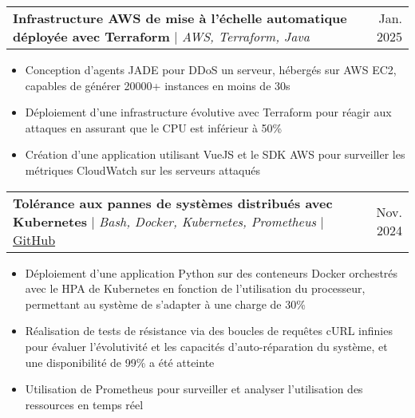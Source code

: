 \documentclass[letterpaper,10.5t]{article}
\makeatletter
\newcommand{\resumeItem}[1]{
  \item\small{
    {#1 \vspace{-2pt}}
  }
}
\newcommand{\resumeProjectHeading}[2]{
    \item
    \begin{tabular*}{0.97\textwidth}{l@{\extracolsep{\fill}}r}
      \small#1 & #2 \\
    \end{tabular*}\vspace{-7pt}
}
\newcommand{\resumeItemListStart}{\begin{itemize}}
\newcommand{\resumeItemListEnd}{\end{itemize}\vspace{-5pt}}
\makeatother
\begin{document}
        \resumeProjectHeading
        {\textbf{Infrastructure AWS de mise à l'échelle automatique déployée avec Terraform} $|$ \emph{AWS, Terraform, Java}}{Jan. 2025}
            \resumeItemListStart
                \resumeItem{Conception d'agents JADE pour DDoS un serveur, hébergés sur AWS EC2, capables de générer 20000+ instances en moins de 30s}
                \resumeItem{Déploiement d'une infrastructure évolutive avec Terraform pour réagir aux attaques en assurant que le CPU est inférieur à 50\%}
                \resumeItem{Création d'une application utilisant VueJS et le SDK AWS pour surveiller les métriques CloudWatch sur les serveurs attaqués}
            \resumeItemListEnd

        \resumeProjectHeading
        {\textbf{Tolérance aux pannes de systèmes distribués avec Kubernetes} $|$ \emph{Bash, Docker, Kubernetes, Prometheus} $|$ \href{https://github.com/Somnef/kubernetes-fault-tolerance}{\underline{GitHub}}}{Nov. 2024}
            \resumeItemListStart
                \resumeItem{Déploiement d'une application Python sur des conteneurs Docker orchestrés avec le HPA de Kubernetes en fonction de l'utilisation du processeur, permettant au système de s'adapter à une charge de 30\%}
                \resumeItem{Réalisation de tests de résistance via des boucles de requêtes cURL infinies pour évaluer l'évolutivité et les capacités d'auto-réparation du système, et une disponibilité de 99\% a été atteinte}
                \resumeItem{Utilisation de Prometheus pour surveiller et analyser l'utilisation des ressources en temps réel}
            \resumeItemListEnd


\end{document}

